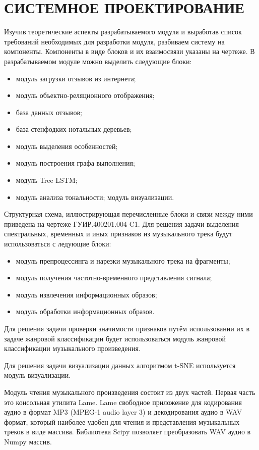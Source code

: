 \section{СИСТЕМНОЕ ПРОЕКТИРОВАНИЕ}
\label{sec:sys}
Изучив теоретические аспекты разрабатываемого модуля и выработав список требований необходимых для разработки модуля, разбиваем систему на компоненты. Компоненты в виде блоков и их взаимосвязи указаны на чертеже.
В разрабатываемом модуле можно выделить следующие блоки:
\begin{itemize}
\item модуль загрузки отзывов из интернета;
\item модуль объектно-реляционного отображения;
\item база данных отзывов;
\item база стенфодких нотальных деревьев;
\item модуль выделения особенностей;
\item модуль построения графа выполнения;
\item модуль Tree LSTM;
\item модуль анализа тональности;
\iten модуль визуализации.
\end{itemize}
Структурная схема, иллюстрирующая перечисленные блоки и связи между ними приведена на чертеже ГУИР.400201.004 C1.
Для решения задачи выделения спектральных, временных и иных признаков из музыкального трека будут использоваться с
ледующие блоки:

\begin{itemize}
\item модуль препроцессинга и нарезки музыкального трека на фрагменты;
\item модуль получения частотно-временного представления сигнала;
\item модуль извлечения информационных образов;
\item модуль обработки информационных образов.
\end{itemize}

Для решения задачи проверки значимости признаков путём использовании их в задаче жанровой классификации будет использоваться модуль жанровой классификации музыкального произведения.

Для решения задачи визуализации данных алгоритмом t-SNE используется модуль визуализации.

Модуль чтения музыкального произведения состоит из двух частей. Первая часть это консольная утилита Lame. Lame свободное приложение для кодирования аудио в формат MP3 (MPEG-1 audio layer 3) и декодирования аудио в WAV формат, который наиболее удобен для чтения и представления музыкальных треков в виде массива. Библиотека Scipy позволяет преобразовать WAV аудио в Numpy массив.

